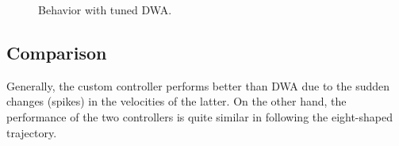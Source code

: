 \documentclass[11pt,a4paper]{article}
\begin{document}
\begin{figure}[H]
{    }
    \quad
    \caption[]{Behavior with tuned DWA.}
\end{figure}


\subsection{Comparison}

Generally, the custom controller performs better than DWA due to the sudden changes (spikes) in
the velocities of the latter.
On the other hand, the performance of the two controllers is quite similar in following
the eight-shaped trajectory.
\end{document}
